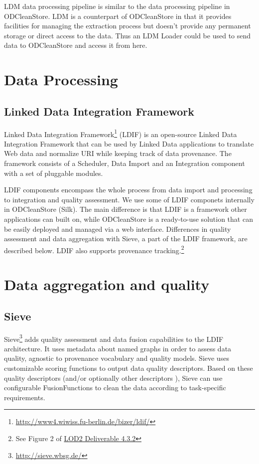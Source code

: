 LDM data processing pipeline is similar to the data processing pipeline in ODCleanStore. LDM is a counterpart of ODCleanStore in that it provides facilities for managing the extraction process but doesn't provide any permanent storage or direct access to the data. Thus an LDM Loader could be used to send data to ODCleanStore and access it from here.

\section{Data Processing}

\subsection*{Linked Data Integration Framework}
Linked Data Integration Framework\footnote{\url{http://www4.wiwiss.fu-berlin.de/bizer/ldif/}} (LDIF) is an open-source Linked Data Integration Framework that can be used by Linked Data applications to translate Web data and normalize URI while keeping track of data provenance.
The framework consists of a Scheduler, Data Import and an Integration component with a set of pluggable modules.

LDIF components encompass the whole process from data import and processing to integration and quality assessment. We use some of LDIF componets internally in ODCleanStore (Silk). The main difference is that LDIF is a framework other applications can built on, while ODCleanStore is a ready-to-use solution that can be easily deployed and managed via a web interface. Differences in quality assessment and data aggregation with Sieve, a part of the LDIF framework, are described below. LDIF also supports provenance tracking.\footnote{See Figure 2 of \href{http://static.lod2.eu/Deliverables/deliverable-4.3.2.pdf}{LOD2 Deliverable 4.3.2}}

\section{Data aggregation and quality}

\subsection*{Sieve}
Sieve\footnote{\url{http://sieve.wbsg.de/}} adds quality assessment and data fusion capabilities to the LDIF architecture. It uses metadata about named graphs in order to assess data quality, agnostic to provenance vocabulary and quality models. Sieve uses customizable scoring functions to output data quality descriptors. Based on these quality descriptors (and/or optionally other descriptors ), Sieve can use configurable FusionFunctions to clean the data according to task-specific requirements.

